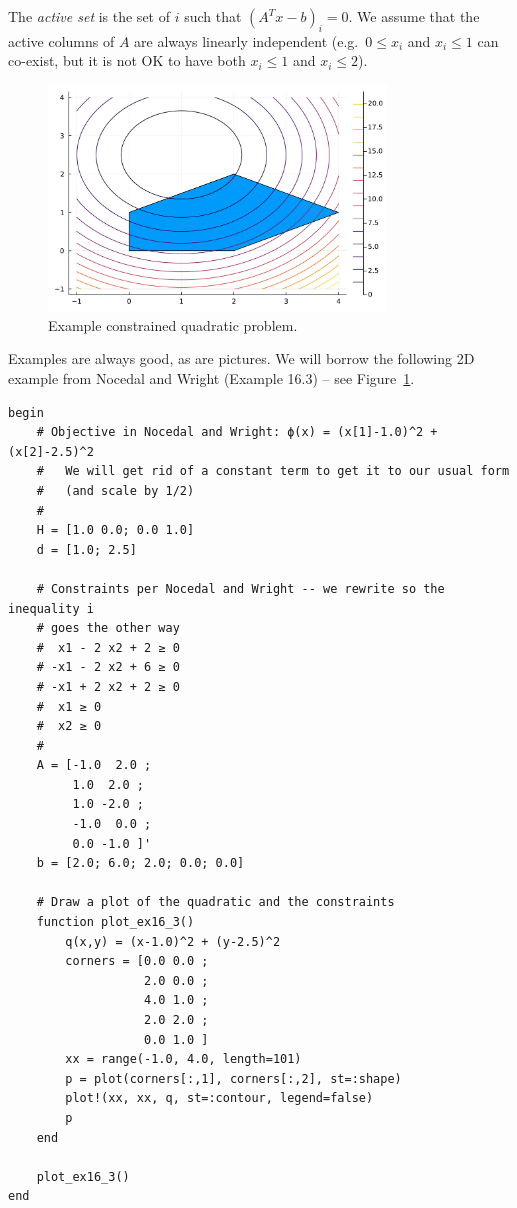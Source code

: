 \documentclass[12pt, leqno]{article} %
\begin{document}
The \emph{active set} is the set of \(i\) such that \((A^T x-b)_i = 0\).
We assume that the active columns of \(A\) are always linearly
independent (e.g.~\(0 \leq x_i\) and \(x_i \leq 1\) can co-exist, but it
is not OK to have both \(x_i \leq 1\) and \(x_i \leq 2\)).

\begin{figure}
\begin{center}
\includegraphics[width=0.8\textwidth]{fig/2023-04-28-ex16_3.pdf}
\end{center}
\caption{Example constrained quadratic problem.}
\label{fig:test-qp}
\end{figure}

Examples are always good, as are pictures.  We will borrow the
following 2D example from Nocedal and Wright (Example 16.3) -- see
Figure~\ref{fig:test-qp}.

\begin{verbatim}
begin
    # Objective in Nocedal and Wright: ϕ(x) = (x[1]-1.0)^2 + (x[2]-2.5)^2
    #   We will get rid of a constant term to get it to our usual form
    #   (and scale by 1/2)
    #
    H = [1.0 0.0; 0.0 1.0]
    d = [1.0; 2.5]

    # Constraints per Nocedal and Wright -- we rewrite so the inequality i
    # goes the other way
    #  x1 - 2 x2 + 2 ≥ 0
    # -x1 - 2 x2 + 6 ≥ 0
    # -x1 + 2 x2 + 2 ≥ 0
    #  x1 ≥ 0
    #  x2 ≥ 0
    #
    A = [-1.0  2.0 ;
         1.0  2.0 ;
         1.0 -2.0 ;
         -1.0  0.0 ;
         0.0 -1.0 ]'
    b = [2.0; 6.0; 2.0; 0.0; 0.0]

    # Draw a plot of the quadratic and the constraints
    function plot_ex16_3()
        q(x,y) = (x-1.0)^2 + (y-2.5)^2
        corners = [0.0 0.0 ;
                   2.0 0.0 ;
                   4.0 1.0 ;
                   2.0 2.0 ;
                   0.0 1.0 ]
        xx = range(-1.0, 4.0, length=101)
        p = plot(corners[:,1], corners[:,2], st=:shape)
        plot!(xx, xx, q, st=:contour, legend=false)
        p
    end

    plot_ex16_3()
end
\end{verbatim}
\end{document}
